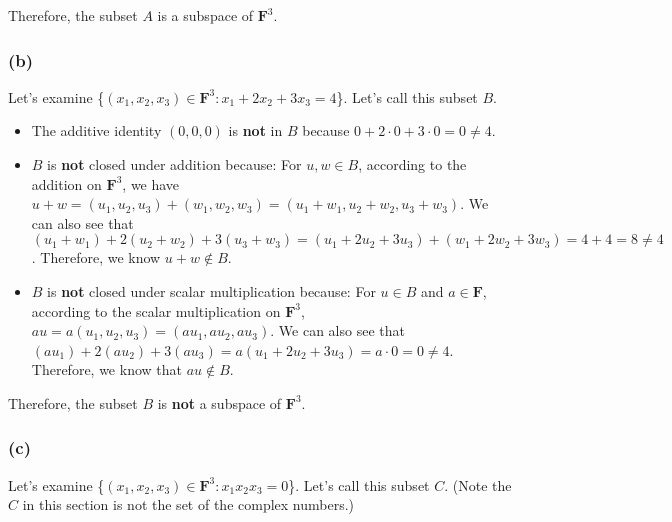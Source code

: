 \documentclass[12pt, letterpaper, oneside]{book}
\begin{document}
Therefore, the subset $A$ is a subspace of $\mathbf{F}^3$.

\subsubsection*{(b)}

Let's examine \{$(x_1, x_2, x_3) \in \mathbf{F}^3: x_1 + 2x_2 + 3x_3 = 4$\}.
Let's call this subset $B$.

\begin{itemize}
  \item The additive identity $(0, 0, 0)$ is \textbf{not} in $B$ because $0 +
          2 \cdot 0 + 3 \cdot 0 = 0 \neq 4$.
  \item $B$ is \textbf{not} closed under addition because: For $u, w \in B$,
        according to the addition on $\mathbf{F}^3$, we have $u + w = (u_1, u_2,
          u_3) + (w_1, w_2, w_3) = (u_1 + w_1, u_2 + w_2, u_3 + w_3)$. We can also
        see that $(u_1 + w_1) + 2(u_2 + w_2) + 3(u_3 + w_3) = (u_1 + 2u_2 + 3u_3) +
          (w_1 + 2w_2 + 3w_3) = 4 + 4 = 8 \neq 4$. Therefore, we know $u + w \notin
          B$.
  \item $B$ is \textbf{not} closed under scalar multiplication because: For $u
          \in B$ and $a \in \mathbf{F}$, according to the scalar multiplication on
        $\mathbf{F}^3$, $au = a(u_1, u_2, u_3) = (a u_1, a u_2, a u_3)$. We can
        also see that $(a u_1) + 2(a u_2) + 3(a u_3) = a(u_1 + 2u_2 + 3u_3) =
          a \cdot 0 = 0 \neq 4$. Therefore, we know that $au \notin B$.
\end{itemize}

Therefore, the subset $B$ is \textbf{not} a subspace of $\mathbf{F}^3$.

\subsubsection*{(c)}

Let's examine \{$(x_1, x_2, x_3) \in \mathbf{F}^3: x_1 x_2 x_3 = 0$\}. Let's
call this subset $C$. (Note the $C$ in this section is not the set of the
complex numbers.)
\end{document}
